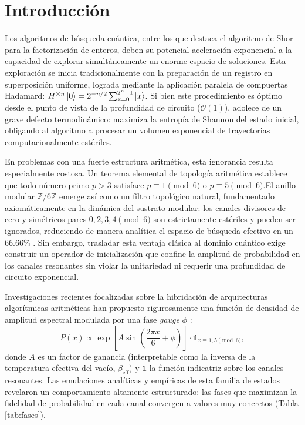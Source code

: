 \documentclass[12pt,a4paper]{article}
\theoremstyle{plain}
\theoremstyle{definition}
\theoremstyle{remark}
\begin{document}
\tableofcontents
\newpage

\section{Introducción}
\label{sec:intro}

Los algoritmos de búsqueda cuántica, entre los que destaca el algoritmo de Shor para la factorización de enteros\cite{Shor1994}, deben su potencial aceleración exponencial a la capacidad de explorar simultáneamente un enorme espacio de soluciones. Esta exploración se inicia tradicionalmente con la preparación de un registro en superposición uniforme, lograda mediante la aplicación paralela de compuertas Hadamard: $H^{\otimes n}\ket{0} = 2^{-n/2}\sum_{x=0}^{2^n-1}\ket{x}$. Si bien este procedimiento es óptimo desde el punto de vista de la profundidad de circuito ($\mathcal{O}(1)$), adolece de un grave defecto termodinámico: maximiza la entropía de Shannon del estado inicial, obligando al algoritmo a procesar un volumen exponencial de trayectorias computacionalmente estériles.

En problemas con una fuerte estructura aritmética, esta ignorancia resulta especialmente costosa. Un teorema elemental de topología aritmética establece que todo número primo $p>3$ satisface $p \equiv 1 \pmod 6$ o $p \equiv 5 \pmod 6$.El anillo modular $\mathbb{Z}/6\mathbb{Z}$ emerge así como un filtro topológico natural, fundamentado axiomáticamente en la dinámica del sustrato modular: los canales divisores de cero y simétricos pares $0,2,3,4 \pmod 6$ son estrictamente estériles y pueden ser ignorados, reduciendo de manera analítica el espacio de búsqueda efectivo en un $66.66\%$ \cite{Peinador_Modular_Substrate_2025, Peinador_Emergencia_Geometria_2025}. Sin embargo, trasladar esta ventaja clásica al dominio cuántico exige construir un operador de inicialización que confine la amplitud de probabilidad en los canales resonantes sin violar la unitariedad ni requerir una profundidad de circuito exponencial.

Investigaciones recientes focalizadas sobre la hibridación de arquitecturas algorítmicas aritméticas han propuesto rigurosamente una función de densidad de amplitud espectral modulada por una fase \textit{gauge} $\phi$ \cite{Peinador_Isomorfismo_DSP_2025}:
\begin{equation}
P(x) \propto \exp\left[A \sin\left(\frac{2\pi x}{6} + \phi\right)\right] \cdot \mathds{1}_{x\equiv 1,5 \pmod{6}},
\label{eq:amplitud}
\end{equation}
donde $A$ es un factor de ganancia (interpretable como la inversa de la temperatura efectiva del vacío, $\beta_{\text{eff}}$) y $\mathds{1}$ la función indicatriz sobre los canales resonantes. Las emulaciones analíticas y empíricas de esta familia de estados revelaron un comportamiento altamente estructurado: las fases que maximizan la fidelidad de probabilidad en cada canal convergen a valores muy concretos (Tabla \ref{tab:fases}).
\end{document}

